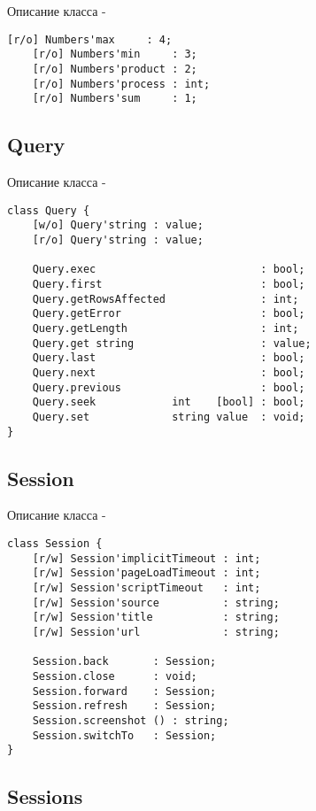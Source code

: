 \noindent Описание класса  -
\begin{lstlisting}[numbers=none]
    [r/o] Numbers'max     : 4;
	[r/o] Numbers'min     : 3;
	[r/o] Numbers'product : 2;
	[r/o] Numbers'process : int;
	[r/o] Numbers'sum     : 1;
\end{lstlisting}

\subsection{{\color{orange} Query}}

\noindent Описание класса  -
\begin{lstlisting}[numbers=none]
class Query {
    [w/o] Query'string : value;
	[r/o] Query'string : value;
	
    Query.exec                          : bool;
	Query.first                         : bool;
	Query.getRowsAffected               : int;
	Query.getError                      : bool;
	Query.getLength                     : int;
	Query.get string                    : value;
	Query.last                          : bool;
	Query.next                          : bool;
	Query.previous                      : bool;
	Query.seek            int    [bool] : bool;
	Query.set             string value  : void;
}
\end{lstlisting}

\subsection{{\color{orange} Session}}

\noindent Описание класса  -
\begin{lstlisting}[numbers=none]
class Session {
    [r/w] Session'implicitTimeout : int;
	[r/w] Session'pageLoadTimeout : int;
	[r/w] Session'scriptTimeout   : int;
	[r/w] Session'source          : string;
	[r/w] Session'title           : string;
	[r/w] Session'url             : string;
	
    Session.back       : Session;
	Session.close      : void;
	Session.forward    : Session;
	Session.refresh    : Session;
	Session.screenshot () : string;
	Session.switchTo   : Session;
}
\end{lstlisting}

\subsection{{\color{orange} Sessions}}

